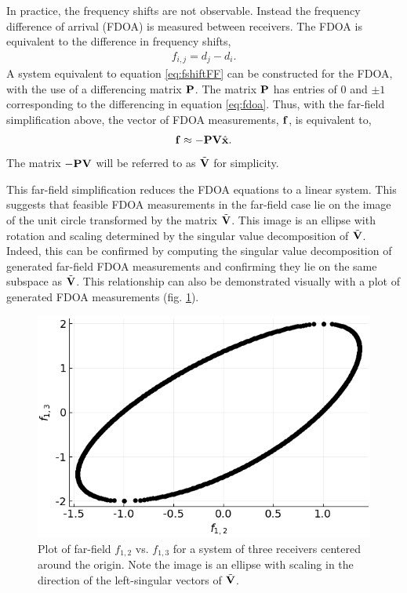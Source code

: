 In practice, the frequency shifts are not observable. Instead the frequency difference of arrival (FDOA) is measured between receivers. The FDOA is equivalent to the difference in frequency shifts,
\begin{align}
  \label{eq:fdoa}
  f_{i,j} = d_j-d_i.
\end{align}
A system equivalent to equation \ref{eq:fshiftFF} can be constructed for the FDOA, with the use of a differencing matrix $\mathbf{P}$. The matrix $\mathbf{P}$ has entries of 0 and $\pm 1$ corresponding to the differencing in equation \ref{eq:fdoa}. Thus, with the far-field simplification above, the vector of FDOA measurements, $\mathbf{f}$, is equivalent to,
\begin{align}
  \label{eq:fdoaFF}
\mathbf{f} \approx -\mathbf{PV}\hat{\mathbf{x}}.
\end{align}
The matrix $\mathbf{-PV}$ will be referred to as $\tilde{\mathbf{V}}$ for simplicity.

This far-field simplification reduces the FDOA equations to a linear system. This suggests that feasible FDOA measurements in the far-field case lie on the image of the unit circle transformed by the matrix $\tilde{\mathbf{V}}$. This image is an ellipse with rotation and scaling determined by the singular value decomposition of $\tilde{\mathbf{V}}$. Indeed, this can be confirmed by computing the singular value decomposition of generated far-field FDOA measurements and confirming they lie on the same subspace as $\tilde{\mathbf{V}}$. This relationship can also be demonstrated visually with a plot of generated FDOA measurements (fig. \ref{f:ellipse}).

\begin{figure}[h!]
  \includegraphics[scale=0.7]{FDOAellipse.png}
  \caption{Plot of far-field $f_{1,2}$ vs. $f_{1,3}$ for a system of three receivers centered around the origin. Note the image is an ellipse with scaling in the direction of the left-singular vectors of $\tilde{\mathbf{V}}$.}
  \label{f:ellipse}
\end{figure}


